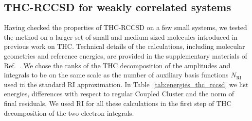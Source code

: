 \subsection{{THC-RCCSD for weakly correlated systems}
\label{sec:thc_weakly_correlated}}
Having checked the properties of THC-RCCSD on a few small systems, we 
tested the method on a larger set of small and medium-sized molecules introduced 
in previous work on THC.\cite{hohenstein_thc3} Technical details of the 
calculations, including molecular geometries and reference energies, are 
provided in the supplementary materials of Ref.~\cite{schutski2017tensor}. We 
chose the ranks of the THC decomposition of the amplitudes and integrals to be 
on the same scale as the number of auxiliary basis functions $N_\mathrm{RI}$ 
used in the standard RI approximation. In Table~\ref{tab:energies_thc_rccsd} we 
list 
energies, differences with respect to regular Coupled Cluster and the norm of 
final residuals. We used RI for all these calculations 
in the first step of THC decomposition of the two electron integrals. 
%
